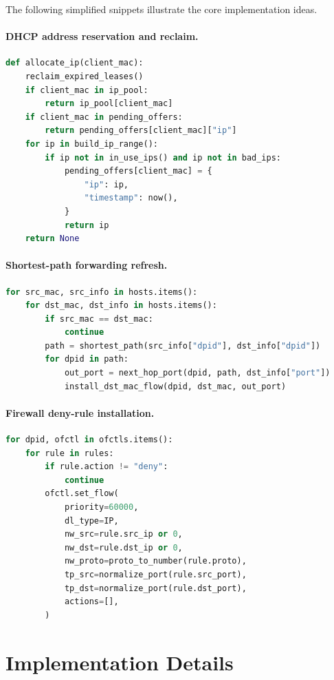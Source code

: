 \documentclass[11pt,a4paper]{article}
\begin{document}
The following simplified snippets illustrate the core implementation ideas.

\paragraph{DHCP address reservation and reclaim.}
\begin{lstlisting}[language=Python]
def allocate_ip(client_mac):
    reclaim_expired_leases()
    if client_mac in ip_pool:
        return ip_pool[client_mac]
    if client_mac in pending_offers:
        return pending_offers[client_mac]["ip"]
    for ip in build_ip_range():
        if ip not in in_use_ips() and ip not in bad_ips:
            pending_offers[client_mac] = {
                "ip": ip,
                "timestamp": now(),
            }
            return ip
    return None
\end{lstlisting}

\paragraph{Shortest-path forwarding refresh.}
\begin{lstlisting}[language=Python]
for src_mac, src_info in hosts.items():
    for dst_mac, dst_info in hosts.items():
        if src_mac == dst_mac:
            continue
        path = shortest_path(src_info["dpid"], dst_info["dpid"])
        for dpid in path:
            out_port = next_hop_port(dpid, path, dst_info["port"])
            install_dst_mac_flow(dpid, dst_mac, out_port)
\end{lstlisting}

\paragraph{Firewall deny-rule installation.}
\begin{lstlisting}[language=Python]
for dpid, ofctl in ofctls.items():
    for rule in rules:
        if rule.action != "deny":
            continue
        ofctl.set_flow(
            priority=60000,
            dl_type=IP,
            nw_src=rule.src_ip or 0,
            nw_dst=rule.dst_ip or 0,
            nw_proto=proto_to_number(rule.proto),
            tp_src=normalize_port(rule.src_port),
            tp_dst=normalize_port(rule.dst_port),
            actions=[],
        )
\end{lstlisting}

\section{Implementation Details}
\end{document}
